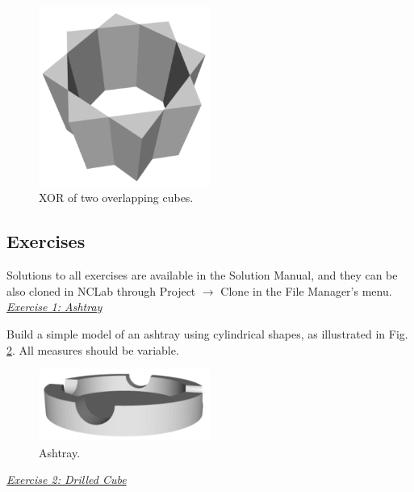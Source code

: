 \documentclass[article,A4,12pt]{llncs}
\begin{document}
\newpage

\begin{figure}[!ht]
\begin{center}
\includegraphics[width=0.5\textwidth]{img/xor-1.png}
\end{center}
\vspace{-2mm}
\caption{XOR of two overlapping cubes.}
\label{fig:xor-1}
\end{figure}
\noindent

\subsection{Exercises}

Solutions to all exercises are available in the Solution Manual, and 
they can be also cloned in NCLab through Project $\rightarrow$ Clone in the 
File Manager's menu.\\

\noindent
\underline{\em Exercise 1: Ashtray}

Build a simple model of an ashtray using cylindrical shapes, 
as illustrated in Fig. \ref{fig:ashtray}.
All measures should be variable.


\begin{figure}[!ht]
\begin{center}
\includegraphics[width=0.5\textwidth]{img/ashtray.png}
\end{center}
\vspace{-2mm}
\caption{Ashtray.}
\label{fig:ashtray}
\end{figure}
\noindent
\noindent
\underline{\em Exercise 2: Drilled Cube}
\end{document}
